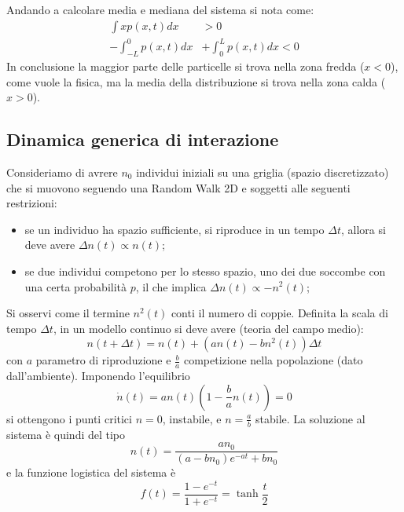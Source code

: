 \documentclass[12pt, a4paper]{book}
\theoremstyle{theorem}
\begin{document}
			Andando a calcolare media e mediana del sistema si nota come:
			\begin{equation*}
				\begin{split}
					\int xp(x,t)dx&>0\\
					-\int_{-L}^0p(x,t)dx&+\int_0^Lp(x,t)dx<0
				\end{split}
			\end{equation*}
			In conclusione la maggior parte delle particelle si trova nella zona fredda ($x<0$), come vuole la fisica, ma la media della distribuzione si trova nella zona calda ($x>0$).
			\subsection{Dinamica generica di interazione}
				Consideriamo di avrere $n_{0}$ individui iniziali su una griglia (spazio discretizzato) che si muovono seguendo una Random Walk 2D e soggetti alle seguenti restrizioni:
				\begin{itemize}
					\item se un individuo ha spazio sufficiente, si riproduce in un tempo $\Delta t$, allora si deve avere $\Delta n(t)\propto n(t)$;
					\item se due individui competono per lo stesso spazio, uno dei due soccombe con una certa probabilità $p$, il che implica $\Delta n(t)\propto -n^{2}(t)$;
				\end{itemize}
				Si osservi come il termine $n^{2}(t)$ conti il numero di coppie.
				Definita la scala di tempo $\Delta t$, in un modello continuo si deve avere (teoria del campo medio):
				\begin{equation*}
					n(t+\Delta t)=n(t)+\left(an(t)-bn^{2}(t)\right)\Delta t
				\end{equation*}
				con $a$ parametro di riproduzione e $\frac{b}{a}$ competizione nella popolazione (dato dall'ambiente).
				Imponendo l'equilibrio
				\begin{equation*}
					\dot{n}(t)=an(t)\left(1-\frac{b}{a}n(t)\right)=0
				\end{equation*}
				si ottengono i punti critici $n=0$, instabile, e $n=\frac{a}{b}$ stabile.
				La soluzione al sistema è quindi del tipo
				\begin{equation}
					n(t)=\frac{an_{0}}{\left(a-bn_{0}\right)e^{-at}+bn_{0}}
				\end{equation}
				e la funzione logistica del sistema è
				\begin{equation}
					f(t)=\frac{1-e^{-t}}{1+e^{-t}}=\tanh\frac{t}{2}
				\end{equation}
\end{document}

